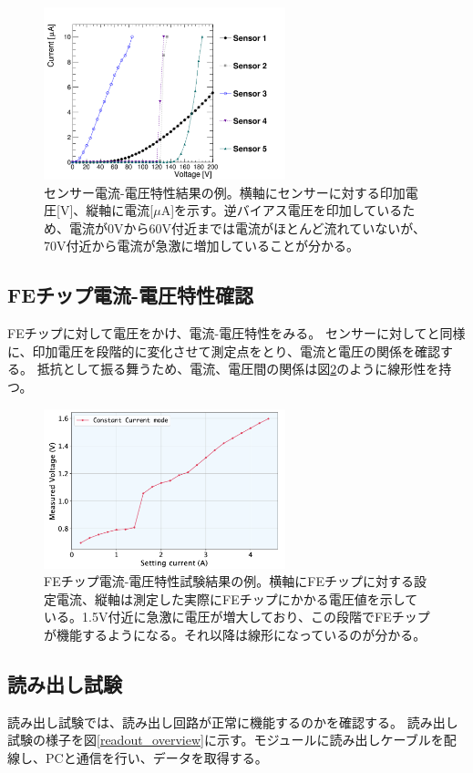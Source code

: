 \begin{figure}[bpt]\centering
\includegraphics[width=7cm]{sensor_IV_result}
\caption[センサー電流-電圧特性結果の例]{センサー電流-電圧特性結果の例\cite{3-4}。横軸にセンサーに対する印加電圧[V]、縦軸に電流[$\mu$A]を示す。逆バイアス電圧を印加しているため、電流が0Vから60V付近までは電流がほとんど流れていないが、70V付近から電流が急激に増加していることが分かる。}
\label{sensor_IV_result}
\end{figure}

\subsection{FEチップ電流-電圧特性確認}
FEチップに対して電圧をかけ、電流-電圧特性をみる。
センサーに対してと同様に、印加電圧を段階的に変化させて測定点をとり、電流と電圧の関係を確認する。
抵抗として振る舞うため、電流、電圧間の関係は図\ref{SLDO_VI_result}のように線形性を持つ。

\begin{figure}[bpt]\centering
\includegraphics[width=7cm]{SLDO_VI_result}
\caption[FEチップ電流-電圧特性試験結果の例。]{FEチップ電流-電圧特性試験結果の例\cite{3-4}。横軸にFEチップに対する設定電流、縦軸は測定した実際にFEチップにかかる電圧値を示している。1.5V付近に急激に電圧が増大しており、この段階でFEチップが機能するようになる。それ以降は線形になっているのが分かる。}
\label{SLDO_VI_result}
\end{figure}

\clearpage
\subsection{読み出し試験}
読み出し試験では、読み出し回路が正常に機能するのかを確認する。
読み出し試験の様子を図\ref{readout_overview}に示す。モジュールに読み出しケーブルを配線し、PCと通信を行い、データを取得する。

